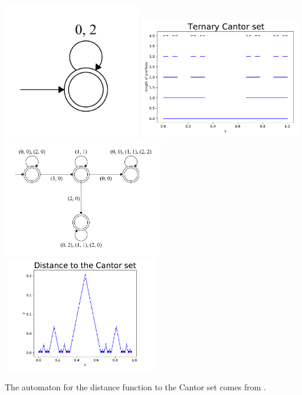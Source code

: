 \documentclass[landscape,usenames,dvipsnames, 25pt]{sciposter}
\begin{document}
\begin{multicols}{3}
\begin{center}
    \includegraphics[width=6cm]{FA20/images/fractals/cantor3-automata.pdf}
    \includegraphics[width=7cm]{FA20/images/fractals/cantor3.pdf}\qquad\qquad
    \includegraphics[width=7cm]{FA20/images/fractals/cantord-automata.pdf}
    \includegraphics[width=7cm, height=5cm]{FA20/images/fractals/cantord.pdf}
\end{center}

{ \tiny The automaton for the distance function to the Cantor set comes from \cite{gorman2019continuous}. }


\end{multicols}
\end{document}
